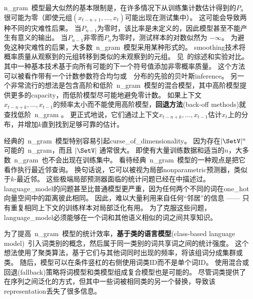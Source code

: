 \gls{n_gram}~模型最大似然的基本限制是，在许多情况下从训练集计数估计得到的$P_n$很可能为零（即使元组$(x_{t-n+1},  \dots, x_{t})$可能出现在测试集中）。
这可能会导致两种不同的灾难性后果。
当$P_{n-1}$为零时，该比率是未定义的，因此模型甚至不能产生有意义的输出。
当$P_{n-1}$非零而$P_n$为零时，测试样本的对数似然为 $-\infty$。
为避免这种灾难性的后果，大多数~\gls{n_gram}~模型采用某种形式的。
\gls{smoothing}技术将概率质量从观察到的元组转移到类似的未观察到的元组。
见~\citet{Chen+Goodman99}的综述和实验对比。
其中一种基本技术基于向所有可能的下一个符号值添加非零概率质量。
这个方法可以被看作带有一个计数参数符合均匀或~~分布的先验的贝叶斯\gls{inference}。
另一个非常流行的想法是包含高阶和低阶~\gls{n_gram}~模型的混合模型，其中高阶模型提供更多的\gls{capacity}，而低阶模型尽可能地避免零计数。
如果上下文$x_{t-n+k}, \ldots, x_{t-1}$的频率太小而不能使用高阶模型，\textbf{回退方法}(back-off methods)就查找低阶~\gls{n_gram} 。
更正式地说，它们通过上下文$x_{t-n+k}, \ldots, x_{t-1}$估计$x_t$上的分布，并增加$k$直到找到足够可靠的估计。


经典的~\gls{n_gram}~模型特别容易引起\gls{curse_of_dimensionality}。
因为存在$|\SetV|^n$可能的~\gls{n_gram}，而且 $|\SetV|$ 通常很大。
即使有大量训练数据和适当的$n$，大多数~\gls{n_gram}~也不会出现在训练集中。
看待经典~\gls{n_gram}~模型的一种观点是把它看作执行最近邻查询。
换句话说，它可以被视为局部\gls{nonparametric}预测器，类似于$k$-最近邻。
这些极端局部预测器面临的统计问题已经在中描述过。
\gls{language_model}的问题甚至比普通模型更严重，因为任何两个不同的词在\gls{one_hot}向量空间中的距离彼此相同。
因此，难以大量利用来自任何``邻居''的信息 —— 只有重复相同上下文的训练样本对局部泛化有用。
为了克服这些问题，\gls{language_model}必须能够在一个词和其他语义相似的词之间共享知识。

为了提高~\gls{n_gram}~模型的统计效率，\textbf{基于类的语言模型}(class-based language model)~\citep{Brown92,Ney+Kneser93,Niesler98}引入词类别的概念，然后属于同一类别的词共享词之间的统计强度。
这个想法使用了聚类算法，基于它们与其他词同时出现的频率，将该组词分成集群或类。
随后，模型可以在条件竖杠的右侧使用词类ID而不是单个词ID。
使用混合或回退(fallback)策略将词模型和类模型组成复合模型也是可能的。
尽管词类提供了在序列之间泛化的方式，但其中一些词被相同类的另一个替换，导致该\gls{representation}丢失了很多信息。

\subsection{}
\label{sec:neural_language_models}

